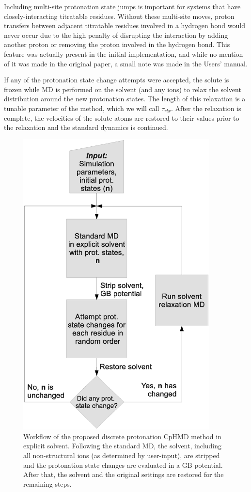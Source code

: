 Including multi-site protonation state jumps is important for systems that have
closely-interacting titratable residues. Without these multi-site moves,
proton transfers between adjacent titratable residues involved in a hydrogen
bond would never occur due to the high penalty of disrupting the interaction by
adding another proton or removing the proton involved in the hydrogen bond. This
feature was actually present in the initial implementation, and while no mention
of it was made in the original paper, a small note was made in the Users'
manual.  \cite{Mongan_JComputChem_2004_v25_p2038}

If any of the protonation state change attempts were accepted, the solute is
frozen while MD is performed on the solvent (and any ions) to relax the solvent
distribution around the new protonation states.  The length of this relaxation
is a tunable parameter of the method, which we will call $\tau_{rlx}$. After the
relaxation is complete, the velocities of the solute atoms are restored to
their values prior to the relaxation and the standard dynamics is continued.

\begin{figure}
   \includegraphics[width=4in]{CpHMD_Workflow.eps}
   \caption{Workflow of the proposed discrete protonation CpHMD method in
            explicit solvent. Following the standard MD, the solvent, including
            all non-structural ions (as determined by user-input), are stripped
            and the protonation state changes are evaluated in a GB potential.
            After that, the solvent and the original settings are restored for
            the remaining steps.}
   \label{fig4:workflow}
\end{figure}

